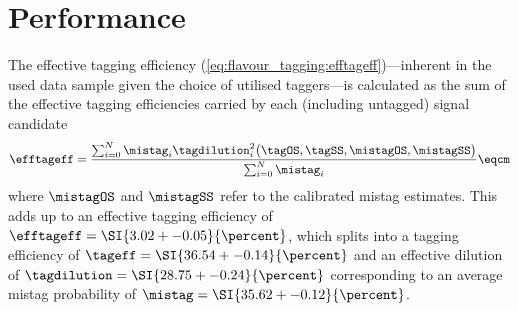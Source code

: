 \section{Performance}
\label{sec:flavour_tagging:performance}

The effective tagging efficiency
(\cref{eq:flavour_tagging:efftageff})---inherent in the used data sample given
the choice of utilised taggers---is calculated as the sum of the effective
tagging efficiencies carried by each (including untagged) signal candidate
%
\begin{equation}
  \efftageff = \frac{\sum_{i=0}^{N} \mistag_i \tagdilution_i^2\big(\tagOS, \tagSS, \mistagOS, \mistagSS \big)}{\sum_{i=0}^{N} \mistag_i}\eqcm
\end{equation}
%
where $\mistagOS$ and $\mistagSS$ refer to the calibrated mistag estimates. This
adds up to an effective tagging efficiency of $\efftageff = \SI{3.02 +-
0.05}{\percent}$, which splits into a tagging efficiency of $\tageff = \SI{36.54
+- 0.14}{\percent}$ and an effective dilution of $\tagdilution = \SI{28.75 +-
0.24}{\percent}$ corresponding to an average mistag probability of $\mistag =
\SI{35.62 +- 0.12}{\percent}$.

